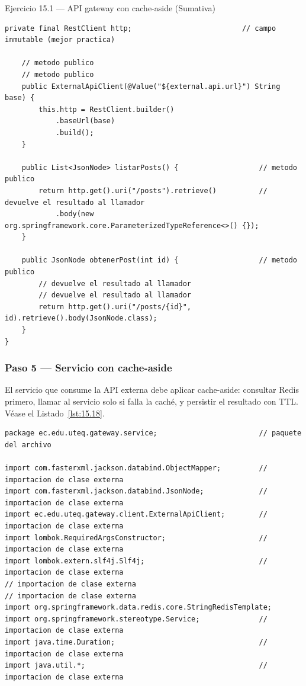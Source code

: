 \documentclass[11pt,a4paper,openany]{book}
\begin{document}
\begin{cajaejercicio}{Ejercicio 15.1 --- API gateway con cache-aside (Sumativa)}
\begin{lstlisting}[style=java,caption={ExternalApiClient.java},label=lst:15.17]
    private final RestClient http;                          // campo inmutable (mejor practica)

    // metodo publico
    // metodo publico
    public ExternalApiClient(@Value("${external.api.url}") String base) {
        this.http = RestClient.builder()
            .baseUrl(base)
            .build();
    }

    public List<JsonNode> listarPosts() {                   // metodo publico
        return http.get().uri("/posts").retrieve()          // devuelve el resultado al llamador
            .body(new org.springframework.core.ParameterizedTypeReference<>() {});
    }

    public JsonNode obtenerPost(int id) {                   // metodo publico
        // devuelve el resultado al llamador
        // devuelve el resultado al llamador
        return http.get().uri("/posts/{id}", id).retrieve().body(JsonNode.class);
    }
}
\end{lstlisting}

\subsubsection*{Paso 5 --- Servicio con cache-aside}

El servicio que consume la API externa debe aplicar
cache-aside: consultar Redis primero, llamar al servicio solo si
falla la caché, y persistir el resultado con TTL. V\'ease el Listado~\ref{lst:15.18}.


\begin{lstlisting}[style=java,caption={PostService.java},label=lst:15.18]
package ec.edu.uteq.gateway.service;                        // paquete del archivo

import com.fasterxml.jackson.databind.ObjectMapper;         // importacion de clase externa
import com.fasterxml.jackson.databind.JsonNode;             // importacion de clase externa
import ec.edu.uteq.gateway.client.ExternalApiClient;        // importacion de clase externa
import lombok.RequiredArgsConstructor;                      // importacion de clase externa
import lombok.extern.slf4j.Slf4j;                           // importacion de clase externa
// importacion de clase externa
// importacion de clase externa
import org.springframework.data.redis.core.StringRedisTemplate;
import org.springframework.stereotype.Service;              // importacion de clase externa
import java.time.Duration;                                  // importacion de clase externa
import java.util.*;                                         // importacion de clase externa


\end{lstlisting}
\end{cajaejercicio}
\end{document}
